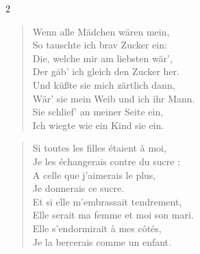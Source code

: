 \documentclass[a4paper,12pt]{article}
\newcommand\chunks[2]{%
\begin{leftcolumn*}\begin{otherlanguage}{german}%
{#1}%
\end{otherlanguage}\end{leftcolumn*}%
\begin{rightcolumn}\begin{otherlanguage}{french}%
{#2}%
\end{otherlanguage}\end{rightcolumn}%
}
\begin{document}
\begin{paracol}{2}
  \chunks{\begin{verse}
          Wenn alle Mädchen wären mein,\\
          So tauschte ich brav Zucker ein:\\
          Die, welche mir am liebsten wär’,\\
          Der gäb’ ich gleich den Zucker her.\\
          Und küßte sie mich zärtlich dann,\\
          Wär’ sie mein Weib und ich ihr Mann.\\
          Sie schlief’ an meiner Seite ein,\\
          Ich wiegte wie ein Kind sie ein.
          \end{verse}}
         {\begin{verse}
          Si toutes les filles étaient à moi,\\
          Je les échangerais contre du sucre :\\
          A celle que j’aimerais le plus,\\
          Je donnerais ce sucre.\\
          Et si elle m’embrassait tendrement,\\
          Elle serait ma femme et moi son mari.\\
          Elle s’endormirait à mes côtés,\\
          Je la bercerais comme un enfant.
          \end{verse}}
\end{paracol}
\end{document}
